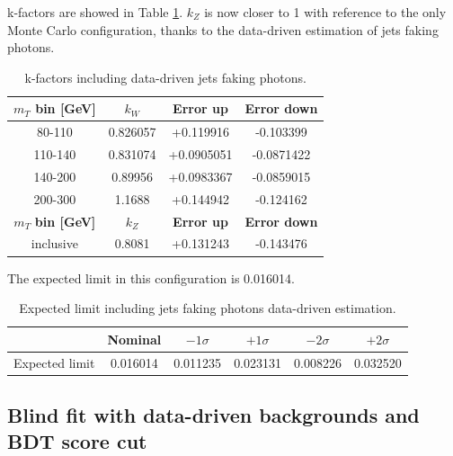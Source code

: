 k-factors are showed in Table \ref{tab:kfac_jfy}. $k_Z$ is now closer to 1 with reference to the only Monte Carlo configuration, thanks to the data-driven estimation of jets faking photons. 
\begin{table}[!htbp]
    \centering
    \begin{tabular}{c|c|c|c}
        \toprule
        $m_T$ \textbf{bin [GeV]} & \textbf{$k_W$} & \textbf{Error up} & \textbf{Error down}  \\
        \hline
         80-110 & 0.826057 &+0.119916 &-0.103399\\
      
        110-140 & 0.831074 & +0.0905051 & -0.0871422 \\
    
        140-200 & 0.89956 &  +0.0983367 & -0.0859015\\
    
        200-300 &  1.1688 & +0.144942 & -0.124162\\
  \hline
    $m_T$ \textbf{bin [GeV]} & \textbf{$k_Z$} & \textbf{Error up} & \textbf{Error down}  \\
    \hline
    inclusive & 0.8081 &+0.131243 &-0.143476\\ 
    \bottomrule
    \end{tabular}
        \caption{k-factors including data-driven jets faking photons. }
    \label{tab:kfac_jfy}
\end{table}
The expected limit in this configuration is 0.016014. 
\begin{table}[!htbp]
    \centering
    
    \begin{tabular}{l
                    S[table-format=1.6]
                    S[table-format=1.6]
                    S[table-format=1.6]
                    S[table-format=1.6]
                    S[table-format=1.6]}
        \toprule
        & {Nominal} & {$-1\sigma$} & {$+1\sigma$} & {$-2\sigma$} & {$+2\sigma$} \\
        \midrule
        Expected limit &
        0.016014 & 0.011235 & 0.023131 & 0.008226 & 0.032520 \\
        
        \bottomrule
    \end{tabular}
    \caption{Expected limit including jets faking photons data-driven estimation.}
\end{table}

\subsection{Blind fit with data-driven backgrounds and BDT score cut}

